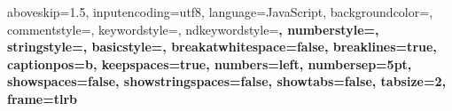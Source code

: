 





\usepackage[colorinlistoftodos]{todonotes}
\newcommand{\mynote}[1]{\todo[author=kks32,size=\small,inline,color=green!40]{#1}}

\usepackage{fancyvrb}
\usepackage{listings}
\usepackage{color}
\usepackage{courier}



 {
	aboveskip={1.5\baselineskip},
	inputencoding=utf8,
	language=JavaScript,
	backgroundcolor=\color{white},
	commentstyle=\color{codegray},
	keywordstyle=\color{brownish},
  ndkeywordstyle=\color{reddish}\bfseries,
	numberstyle=\tiny\color{codegray},
	stringstyle=\color{blueish},
	basicstyle=\scriptsize\ttfamily,
	breakatwhitespace=false,
	breaklines=true,
	captionpos=b,
	keepspaces=true,
	numbers=left,
	numbersep=5pt,
	showspaces=false,
	showstringspaces=false,
	showtabs=false,
	tabsize=2,
	frame=tlrb
}

\lstset{style=mystyle}
